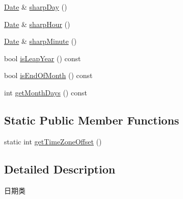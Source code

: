 \begin{DoxyCompactItemize}
\item 
\hyperlink{classec_1_1Date}{Date} \& \hyperlink{classec_1_1Date_a327e2a4dc6386e97b37888b583023eea}{sharp\-Day} ()
\item 
\hyperlink{classec_1_1Date}{Date} \& \hyperlink{classec_1_1Date_ad92119be62b4a7389233616ec6570b55}{sharp\-Hour} ()
\item 
\hyperlink{classec_1_1Date}{Date} \& \hyperlink{classec_1_1Date_a4e9575e8c724584871afd31c9bd3ff8b}{sharp\-Minute} ()
\item 
bool \hyperlink{classec_1_1Date_ab57efb14c24f86b7b3f80457ec4ff930}{is\-Leap\-Year} () const 
\item 
bool \hyperlink{classec_1_1Date_a1a7235d7bf12af52f16bccded463eeab}{is\-End\-Of\-Month} () const 
\item 
int \hyperlink{classec_1_1Date_a9cfe68c456d2de8aef5e2d168fd9ca61}{get\-Month\-Days} () const 
\end{DoxyCompactItemize}
\subsection*{Static Public Member Functions}
\begin{DoxyCompactItemize}
\item 
static int \hyperlink{classec_1_1Date_a7003f97919dbfec532a4a37c4daef6d8}{get\-Time\-Zone\-Offset} ()
\end{DoxyCompactItemize}


\subsection{Detailed Description}
日期类 

